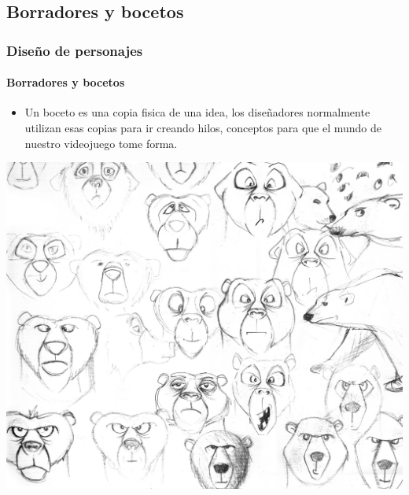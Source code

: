 \documentclass[11pt]{beamer}
\begin{document}
\subsection{Borradores y bocetos}
\begin{frame}
\frametitle{Diseño de personajes}
\framesubtitle{Borradores y bocetos}
\begin{itemize}
\item Un boceto es una copia fisica de una idea, los diseñadores normalmente  utilizan esas copias para ir creando hilos, conceptos para que el mundo de nuestro videojuego tome forma.
\end{itemize}
\begin{center}
 \includegraphics[scale=0.05,keepaspectratio=true]{img/BOCETOS_oso.png}
\end{center}
\end{frame}
\end{document}
